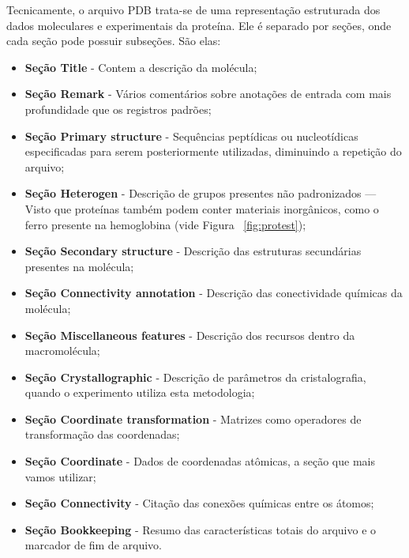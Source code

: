 Tecnicamente, o arquivo PDB trata-se de uma representação estruturada dos dados moleculares e experimentais da proteína. Ele é separado por seções, onde cada seção pode possuir subseções. São elas: 
\begin{itemize}
	\item \textbf{Seção Title} - Contem a descrição da molécula;
	\vspace{-0.3cm}
	
	\item \textbf{Seção Remark} - Vários comentários sobre anotações de entrada com mais profundidade que os registros padrões;
	\vspace{-0.3cm}
	
	\item \textbf{Seção Primary structure} - Sequências peptídicas ou nucleotídicas especificadas para serem posteriormente utilizadas, diminuindo a repetição do arquivo;
	
	\vspace{-0.3cm}
	\item \textbf{Seção Heterogen} - Descrição de grupos presentes não padronizados --- Visto que proteínas também podem conter materiais inorgânicos, como o ferro presente na hemoglobina (vide Figura ~\ref{fig:protest});
	\vspace{-0.3cm}
	
	\item \textbf{Seção Secondary structure} - Descrição das estruturas secundárias presentes na molécula;
	
	\vspace{-0.3cm}
	\item \textbf{Seção Connectivity annotation} - Descrição das conectividade químicas da molécula;
	\vspace{-0.3cm}
	
	\item \textbf{Seção Miscellaneous features} - Descrição dos recursos dentro da macromolécula;
	\vspace{-0.3cm}
	
	\item \textbf{Seção Crystallographic} - Descrição de parâmetros da cristalografia, quando o experimento utiliza esta metodologia;
	
	\vspace{-0.3cm}
	\item \textbf{Seção Coordinate transformation} - Matrizes como operadores de transformação das coordenadas;
	\vspace{-0.3cm}
	
	\item \textbf{Seção Coordinate} - Dados de coordenadas atômicas, a seção que mais vamos utilizar;
	\vspace{-0.3cm}
	
	\item \textbf{Seção Connectivity} - Citação das conexões químicas entre os átomos;
	\vspace{-0.3cm}
	
	\item \textbf{Seção Bookkeeping} - Resumo das características totais do arquivo e o marcador de fim de arquivo.
\end{itemize}

